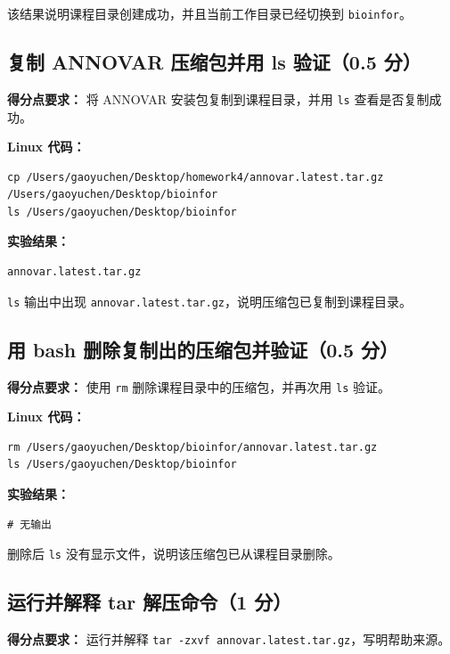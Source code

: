 \documentclass[12pt,a4paper,fontset=fandol]{ctexart}
\begin{document}
该结果说明课程目录创建成功，并且当前工作目录已经切换到 \texttt{bioinfor}。

\subsection{复制 ANNOVAR 压缩包并用 ls 验证（0.5 分）}

\noindent\textbf{得分点要求：} 将 ANNOVAR 安装包复制到课程目录，并用 \texttt{ls} 查看是否复制成功。

\noindent\textbf{Linux 代码：}
\begin{lstlisting}[style=linuxcode]
cp /Users/gaoyuchen/Desktop/homework4/annovar.latest.tar.gz /Users/gaoyuchen/Desktop/bioinfor
ls /Users/gaoyuchen/Desktop/bioinfor
\end{lstlisting}

\noindent\textbf{实验结果：}
\begin{lstlisting}[style=resultcode]
annovar.latest.tar.gz
\end{lstlisting}

\texttt{ls} 输出中出现 \texttt{annovar.latest.tar.gz}，说明压缩包已复制到课程目录。

\subsection{用 bash 删除复制出的压缩包并验证（0.5 分）}

\noindent\textbf{得分点要求：} 使用 \texttt{rm} 删除课程目录中的压缩包，并再次用 \texttt{ls} 验证。

\noindent\textbf{Linux 代码：}
\begin{lstlisting}[style=linuxcode]
rm /Users/gaoyuchen/Desktop/bioinfor/annovar.latest.tar.gz
ls /Users/gaoyuchen/Desktop/bioinfor
\end{lstlisting}

\noindent\textbf{实验结果：}
\begin{lstlisting}[style=resultcode]
# 无输出
\end{lstlisting}

删除后 \texttt{ls} 没有显示文件，说明该压缩包已从课程目录删除。

\subsection{运行并解释 tar 解压命令（1 分）}

\noindent\textbf{得分点要求：} 运行并解释 \texttt{tar -zxvf annovar.latest.tar.gz}，写明帮助来源。
\end{document}
